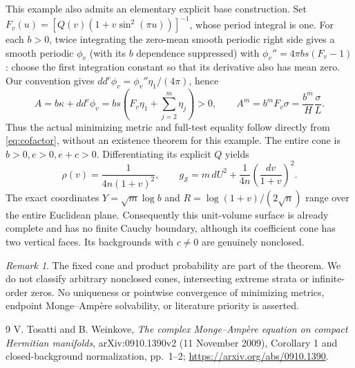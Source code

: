 \documentclass[11pt]{article}
\newcommand{\ddc}{dd^c}
\theoremstyle{remark}\newtheorem{remark}[theorem]{Remark}
\begin{document}
This example also admits an elementary explicit base construction. Set
$F_v(u)=[Q(v)(1+v\sin^2(\pi u))]^{-1}$, whose period integral is one.
For each $b>0$, twice integrating the zero-mean smooth periodic right side
gives a smooth periodic $\phi_v$ (with its $b$ dependence suppressed)
with $\phi_v''=4\pi bs(F_v-1)$: choose the
first integration constant so that its derivative also has mean zero.
Our convention gives $\ddc\phi_v=\phi_v''\eta_1/(4\pi)$, hence
\[
 A=b\kappa+\ddc\phi_v
 =bs\left(F_v\eta_1+\sum_{j=2}^m\eta_j\right)>0,
 \qquad A^m=b^mF_v\sigma=\frac{b^m}{H}\frac{\sigma}{L}.
\]
Thus the actual minimizing metric and full-test equality follow directly
from \eqref{eq:cofactor}, without an existence theorem for this example.
The entire cone is $b>0,e>0,e+c>0$. Differentiating its explicit $Q$ yields
\[
 \rho(v)=\frac1{4n(1+v)^2},\qquad
 g_{\mathcal S}=m\,dU^2+\frac1{4n}\left(\frac{dv}{1+v}\right)^2.
\]
The exact coordinates $Y=\sqrt m\log b$ and
$R=\log(1+v)/(2\sqrt n)$ range over the entire Euclidean plane.
Consequently this unit-volume surface is already complete and has no
finite Cauchy boundary, although its coefficient cone has two vertical faces.
Its backgrounds with $c\ne0$ are genuinely nonclosed.

\begin{remark}
The fixed cone and product probability are part of the theorem. We do
not classify arbitrary nonclosed cones, intersecting extreme strata or
infinite-order zeros. No uniqueness or pointwise convergence of minimizing
metrics, endpoint Monge--Amp\`ere solvability, or literature priority is asserted.
\end{remark}
\begin{thebibliography}{9}
 V. Tosatti and B. Weinkove, \emph{The complex Monge--Amp\`ere
equation on compact Hermitian manifolds}, arXiv:0910.1390v2 (11 November 2009),
Corollary 1 and closed-background normalization, pp.~1--2;
\url{https://arxiv.org/abs/0910.1390}.
\end{thebibliography}
\end{document}
